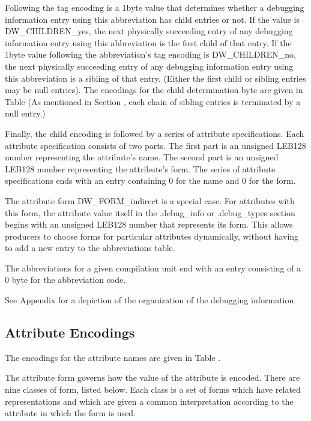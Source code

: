 Following the tag encoding is a 1\dash byte value that determines
whether a debugging information entry using this abbreviation
has child entries or not. If the value is DW\-\_CHILDREN\-\_yes,
the next physically succeeding entry of any debugging
information entry using this abbreviation is the first
child of that entry. If the 1\dash byte value following the
abbreviation’s tag encoding is DW\-\_CHILDREN\-\_no, the next
physically succeeding entry of any debugging information entry
using this abbreviation is a sibling of that entry. (Either
the first child or sibling entries may be null entries). The
encodings for the child determination byte are given in 
Table 
(As mentioned in 
Section , 
each chain of
sibling entries is terminated by a null entry.)

Finally, the child encoding is followed by a series of
attribute specifications. Each attribute specification
consists of two parts. The first part is an unsigned LEB128
number representing the attribute’s name. The second part
is an unsigned LEB128 number representing the attribute’s
form. The series of attribute specifications ends with an
entry containing 0 for the name and 0 for the form.

The attribute form DW\-\_FORM\-\_indirect is a special case. For
attributes with this form, the attribute value itself in the
.debug\_info or .debug\_types section begins with an unsigned
LEB128 number that represents its form. This allows producers
to choose forms for particular attributes dynamically,
without having to add a new entry to the abbreviations table.

The abbreviations for a given compilation unit end with an
entry consisting of a 0 byte for the abbreviation code.

See 
Appendix  
for a depiction of the organization of the
debugging information.

\subsection{Attribute Encodings}
\label{datarep:attributeencodings}

The encodings for the attribute names are given in 
Table .

The attribute form governs how the value of the attribute is
encoded. There are nine classes of form, listed below. Each
class is a set of forms which have related representations
and which are given a common interpretation according to the
attribute in which the form is used.

